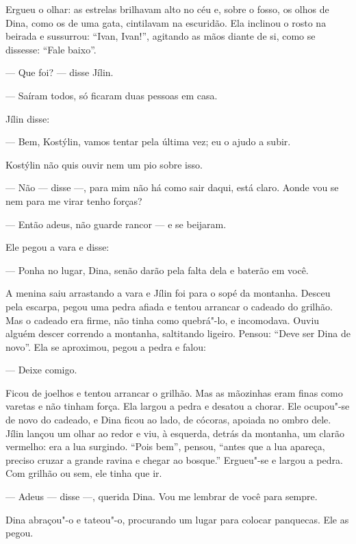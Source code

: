 Ergueu o olhar: as estrelas brilhavam alto no céu e, sobre o fosso,
os olhos de Dina, como os de uma gata, cintilavam na escuridão. Ela
inclinou o rosto na beirada e sussurrou: ``Ivan, Ivan!'', agitando as
mãos diante de si, como se dissesse: ``Fale baixo''.

--- Que foi? --- disse Jílin.

--- Saíram todos, só ficaram duas pessoas em casa.

Jílin disse:

--- Bem, Kostýlin, vamos tentar pela última vez; eu o ajudo a subir.

Kostýlin não quis ouvir nem um pio sobre isso.

--- Não --- disse ---, para mim não há como sair daqui, está claro. Aonde vou se nem para me virar tenho forças?

--- Então adeus, não guarde rancor --- e se beijaram.


Ele pegou a vara e disse:

--- Ponha no lugar, Dina, senão darão pela falta dela e baterão em você.

A menina saiu arrastando a vara e Jílin foi para o sopé da montanha. Desceu
pela escarpa, pegou uma pedra afiada e tentou arrancar o cadeado do
grilhão. Mas o cadeado era firme, não tinha como quebrá"-lo, e
incomodava. Ouviu alguém descer correndo a montanha, saltitando ligeiro.
Pensou: ``Deve ser Dina de novo''. Ela se aproximou, pegou a pedra e
falou:

--- Deixe comigo.

Ficou de joelhos e tentou arrancar o grilhão. Mas as mãozinhas eram
finas como varetas e não tinham força. Ela largou a pedra e desatou a
chorar. Ele ocupou"-se de novo do cadeado, e Dina ficou ao lado, de
cócoras, apoiada no ombro dele. Jílin lançou um olhar ao redor e viu, à
esquerda, detrás da montanha, um clarão vermelho: era a lua surgindo.
``Pois bem'', pensou, ``antes que a lua apareça, preciso cruzar a grande
ravina e chegar ao bosque.'' Ergueu"-se e largou a pedra. Com grilhão ou
sem, ele tinha que ir.

--- Adeus --- disse ---, querida Dina. Vou me lembrar de você para
sempre.

Dina abraçou"-o e tateou"-o, procurando um lugar para colocar panquecas.
Ele as pegou.

